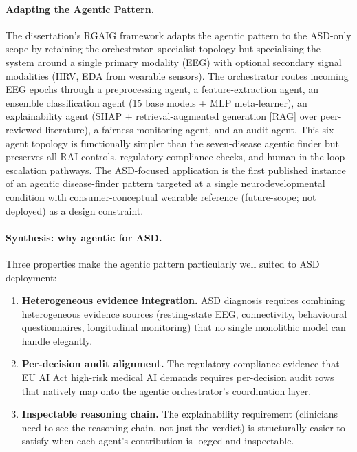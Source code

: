 \paragraph{Adapting the Agentic Pattern.}
The dissertation's RGAIG framework adapts the agentic pattern to the ASD-only scope by retaining the orchestrator--specialist topology but specialising the system around a single primary modality (EEG) with optional secondary signal modalities (HRV, EDA from wearable sensors). The orchestrator routes incoming EEG epochs through a preprocessing agent, a feature-extraction agent, an ensemble classification agent (15 base models + MLP meta-learner), an explainability agent (SHAP + retrieval-augmented generation [RAG] over peer-reviewed literature), a fairness-monitoring agent, and an audit agent. This six-agent topology is functionally simpler than the seven-disease agentic finder but preserves all RAI controls, regulatory-compliance checks, and human-in-the-loop escalation pathways. The ASD-focused application is the first published instance of an agentic disease-finder pattern targeted at a single neurodevelopmental condition with consumer-conceptual wearable reference (future-scope; not deployed) as a design constraint.

\paragraph{Synthesis: why agentic for ASD.}
Three properties make the agentic pattern particularly well suited to ASD deployment:

\begin{enumerate}[leftmargin=*, itemsep=2pt, label=(\roman*)]
\item \textbf{Heterogeneous evidence integration.} ASD diagnosis requires combining heterogeneous evidence sources (resting-state EEG, connectivity, behavioural questionnaires, longitudinal monitoring) that no single monolithic model can handle elegantly.
\item \textbf{Per-decision audit alignment.} The regulatory-compliance evidence that EU AI Act high-risk medical AI demands requires per-decision audit rows that natively map onto the agentic orchestrator's coordination layer.
\item \textbf{Inspectable reasoning chain.} The explainability requirement (clinicians need to see the reasoning chain, not just the verdict) is structurally easier to satisfy when each agent's contribution is logged and inspectable.
\end{enumerate}

